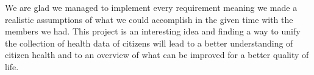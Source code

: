 We are glad we managed to implement every requirement 
meaning we made a realistic assumptions of what we could accomplish in the given time with the members we had.
This project is an interesting idea and finding a way to unify the collection of health data of citizens will lead to a better understanding of citizen health and to an \iffalse easier\fi overview of what can be improved for a better quality of life. 
\fi